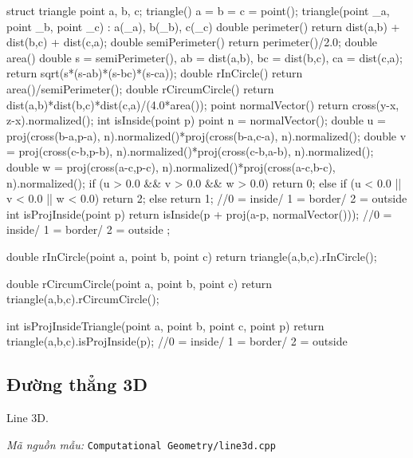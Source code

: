 \documentclass[11pt]{article}
\newcommand{\codepath}[1]{\par\noindent\textit{Mã nguồn mẫu:} \texttt{#1}\par}
\begin{document}
\begingroup\scriptsize
\begin{vncode}
struct triangle{
	point a, b, c;
	triangle() { a = b = c = point(); }
	triangle(point _a, point _b, point _c) : a(_a), b(_b), c(_c) {}
	double perimeter() { return dist(a,b) + dist(b,c) + dist(c,a); }
	double semiPerimeter() { return perimeter()/2.0; }
	double area() {
		double s = semiPerimeter(), ab = dist(a,b),
			bc = dist(b,c), ca = dist(c,a);
		return sqrt(s*(s-ab)*(s-bc)*(s-ca));
	}
	double rInCircle() {
		return area()/semiPerimeter();
	}
	double rCircumCircle() {
		return dist(a,b)*dist(b,c)*dist(c,a)/(4.0*area());
	}
	point normalVector() {
		return cross(y-x, z-x).normalized();
	}
	int isInside(point p) {
		point n = normalVector();
		double u = proj(cross(b-a,p-a), n).normalized()*proj(cross(b-a,c-a), n).normalized();
		double v = proj(cross(c-b,p-b), n).normalized()*proj(cross(c-b,a-b), n).normalized();
		double w = proj(cross(a-c,p-c), n).normalized()*proj(cross(a-c,b-c), n).normalized();
		if (u > 0.0 && v > 0.0 && w > 0.0) return 0;
		else if (u < 0.0 || v < 0.0 || w < 0.0) return 2;
		else return 1;
	} //0 = inside/ 1 = border/ 2 = outside
	int isProjInside(point p) {
		return isInside(p + proj(a-p, normalVector()));
	} //0 = inside/ 1 = border/ 2 = outside
};

double rInCircle(point a, point b, point c) {
	return triangle(a,b,c).rInCircle();
}

double rCircumCircle(point a, point b, point c) {
	return triangle(a,b,c).rCircumCircle();
}

int isProjInsideTriangle(point a, point b, point c, point p) {
	return triangle(a,b,c).isProjInside(p);
} //0 = inside/ 1 = border/ 2 = outside
\end{vncode}
\endgroup


\subsection{Đường thẳng 3D}

Line 3D.

\codepath{Computational Geometry/line3d.cpp}
\end{document}
